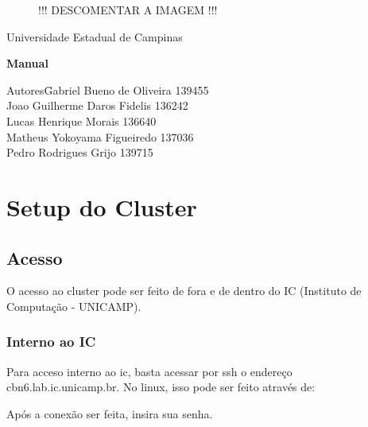 \documentclass[a4paper,10pt]{article}
\date{\today}
\begin{document}
    \begin{titlepage}
        \begin{figure}
            \centering
!!! DESCOMENTAR A IMAGEM !!!

        \end{figure}
        \begin{center}
            \huge{Universidade Estadual de Campinas}

        \vfill
        \textbf{\LARGE{Manual}}
        \vfill
        \end{center}

        \begin{flushleft}
            \begin{tabbing}
                Autores\qquad\qquad\= Gabriel Bueno de Oliveira 139455 \\
                    \>Joao Guilherme Daros Fidelis 136242 \\
                    \>Lucas Henrique Morais 136640 \\
                    \>Matheus Yokoyama Figueiredo 137036\\
                    \>Pedro Rodrigues Grijo 139715\\
            \end{tabbing}
        \end{flushleft}
    \end{titlepage}

\newpage
\section{Setup do Cluster}
    \subsection{Acesso}
    O acesso ao cluster pode ser feito de fora e de dentro do IC (Instituto de Computação - UNICAMP).
        \subsubsection{Interno ao IC}
        Para acceso interno ao ic, basta acessar por ssh o endereço cbn6.lab.ic.unicamp.br. No linux, isso pode ser feito através de:

        Após a conexão ser feita, insira sua senha.
\end{document}
